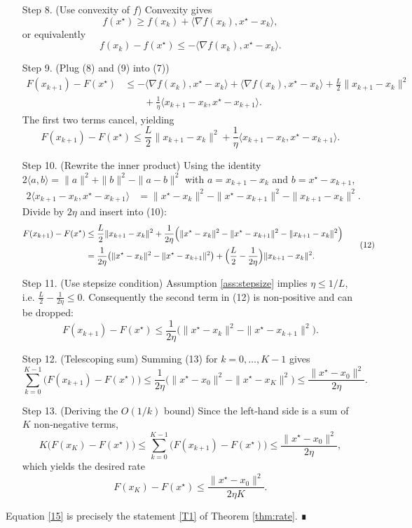 \documentclass{article}
\begin{document}
\begin{enumerate}
\item[Step 8.] (Use convexity of $f$)  
Convexity gives
\[
f(x^{\star})\ge f(x_{k})+\langle\nabla f(x_{k}),x^{\star}-x_{k}\rangle,
\]
or equivalently
\[
f(x_{k})-f(x^{\star})\le -\langle\nabla f(x_{k}),x^{\star}-x_{k}\rangle .
\tag{9}
\]

\item[Step 9.] (Plug (8) and (9) into (7))  
\[
\begin{aligned}
F(x_{k+1})-F(x^{\star})
&\le -\langle\nabla f(x_{k}),x^{\star}-x_{k}\rangle
+\langle\nabla f(x_{k}),x^{\star}-x_{k}\rangle
+\frac{L}{2}\|x_{k+1}-x_{k}\|^{2}\\
&\qquad+\frac{1}{\eta}\langle x_{k+1}-x_{k},x^{\star}-x_{k+1}\rangle .
\end{aligned}
\]
The first two terms cancel, yielding
\[
F(x_{k+1})-F(x^{\star})
\le \frac{L}{2}\|x_{k+1}-x_{k}\|^{2}
+\frac{1}{\eta}\langle x_{k+1}-x_{k},x^{\star}-x_{k+1}\rangle .
\tag{10}
\]

\item[Step 10.] (Rewrite the inner product)  
Using the identity $2\langle a,b\rangle =\|a\|^{2}+\|b\|^{2}-\|a-b\|^{2}$ with 
$a=x_{k+1}-x_{k}$ and $b=x^{\star}-x_{k+1}$,
\[
\begin{aligned}
2\langle x_{k+1}-x_{k},x^{\star}-x_{k+1}\rangle
&=\|x^{\star}-x_{k}\|^{2}-\|x^{\star}-x_{k+1}\|^{2}
-\|x_{k+1}-x_{k}\|^{2}.
\end{aligned}
\tag{11}
\]
Divide by $2\eta$ and insert into (10):
\[
\begin{aligned}
F(x_{k+1})-F(x^{\star})
&\le \frac{L}{2}\|x_{k+1}-x_{k}\|^{2}
+\frac{1}{2\eta}\Bigl(\|x^{\star}-x_{k}\|^{2}
-\|x^{\star}-x_{k+1}\|^{2}
-\|x_{k+1}-x_{k}\|^{2}\Bigr)\\
&= \frac{1}{2\eta}\bigl(\|x^{\star}-x_{k}\|^{2}
-\|x^{\star}-x_{k+1}\|^{2}\bigr)
+\Bigl(\frac{L}{2}-\frac{1}{2\eta}\Bigr)\|x_{k+1}-x_{k}\|^{2}.
\end{aligned}
\tag{12}
\]

\item[Step 11.] (Use stepsize condition)  
Assumption \ref{ass:stepsize} implies $\eta\le 1/L$, i.e. $\frac{L}{2}-\frac{1}{2\eta}\le0$.
Consequently the second term in (12) is non‑positive and can be dropped:
\[
F(x_{k+1})-F(x^{\star})
\le \frac{1}{2\eta}\bigl(\|x^{\star}-x_{k}\|^{2}
-\|x^{\star}-x_{k+1}\|^{2}\bigr).
\tag{13}
\]

\item[Step 12.] (Telescoping sum)  
Summing (13) for $k=0,\dots,K-1$ gives
\[
\sum_{k=0}^{K-1}\bigl(F(x_{k+1})-F(x^{\star})\bigr)
\le \frac{1}{2\eta}\bigl(\|x^{\star}-x_{0}\|^{2}
-\|x^{\star}-x_{K}\|^{2}\bigr)
\le \frac{\|x^{\star}-x_{0}\|^{2}}{2\eta}.
\tag{14}
\]

\item[Step 13.] (Deriving the $O(1/k)$ bound)  
Since the left‑hand side is a sum of $K$ non‑negative terms,
\[
K\bigl(F(x_{K})-F(x^{\star})\bigr)
\le \sum_{k=0}^{K-1}\bigl(F(x_{k+1})-F(x^{\star})\bigr)
\le \frac{\|x^{\star}-x_{0}\|^{2}}{2\eta},
\]
which yields the desired rate
\[
F(x_{K})-F(x^{\star})\le \frac{\|x^{\star}-x_{0}\|^{2}}{2\eta K}.
\tag{15}
\]
\end{enumerate}
Equation \eqref{15} is precisely the statement \eqref{T1} of Theorem \ref{thm:rate}. ∎
\end{document}
